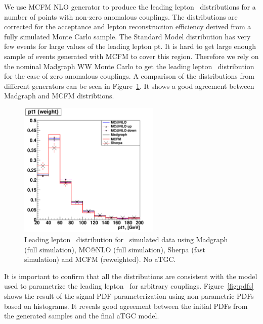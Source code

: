 We use MCFM NLO generator to produce the leading lepton \pt\
distributions for a number of points with non-zero anomalous
couplings. The distributions are corrected for the acceptance and
lepton reconstruction efficiency derived from a fully simulated Monte
Carlo sample. The Standard Model distribution has very few events for
large values of the leading lepton pt. It is hard to get large enough
sample of events generated with MCFM to cover this region. Therefore
we rely on the nominal Madgraph WW Monte Carlo to get the leading
lepton \pt\ distribution for the case of zero anomalous couplings. A
comparison of the distributions from different generators can be seen
in Figure~\ref{fig:generator_comparison}. It shows a good agreement
between Madgraph and MCFM distribtions.

\begin{figure}[tp]
  \centerline{
    \includegraphics[width=0.6\textwidth]{figures/generator_comparison.pdf}
  }

  \caption[Generator comparison]{Leading lepton \pt\ distribution
  for \WW\ simulated data using Madgraph (full simulation), MC@NLO (full simulation),
  Sherpa (fast simulation) and MCFM (reweighted). No aTGC.}

  \label{fig:generator_comparison}
\end{figure}

It is important to confirm that all the distributions are consistent
with the model used to parametrize the leading lepton \pt\ for
arbitrary couplings. Figure~\ref{fig:pdfs} shows the result of the signal PDF
parameterization using non-parametric PDFs based on histograms. It
reveals good agreement between the initial PDFs from the
generated samples and the final aTGC model.


